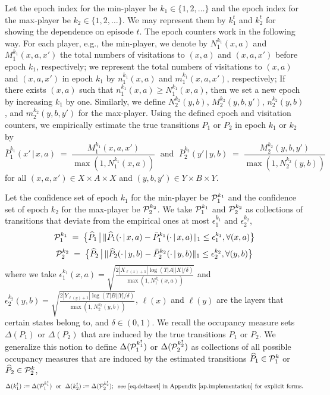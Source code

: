 \documentclass[12pt, final]{l4dc2023}
\begin{document}
Let the epoch index for the min-player be $k_1\in \{1,2,\ldots \}$ and the epoch index for the max-player be $k_2\in\{1,2,\ldots \}$. We may represent them by $k_1^t$ and $k_2^t$ for showing the dependence on episode $t$. The epoch counters work in the following way. For each player, e.g., the min-player, we denote by $N_{1}^{k_1}(x,a)$ and $M_1^{k_1}(x,a,x')$ the total numbers of visitations to $(x,a)$ and $(x,a,x')$ before epoch $k_1$, respectively; we represent the total numbers of visitations to $(x,a)$ and $(x,a,x')$ in epoch $k_1$ by $n_{1}^{k_1}(x,a)$ and $m_1^{k_1}(x,a,x')$, respectively; If there exists $(x,a)$ such that $n_{1}^{k_1}(x,a)\geq N_{1}^{k_1}(x,a)$, then we set a new epoch by increasing $k_1$ by one. Similarly, we define $N_{2}^{k_2}(y,b)$, $M_2^{k_2}(y,b,y')$,  $n_{2}^{k_2}(y,b)$, and $m_2^{k_2}(y,b,y')$ for the max-player. Using the defined epoch and visitation counters, we empirically estimate the true transitions $P_1$ or $P_2$ in epoch $k_1$ or $k_2$ by 
\[
\bar P_1^{k_1} (x'\,\vert\,x,a) \; = \;  \frac{M_1^{k_1}(x,a,x')}{\max (1,N_{1}^{k_1}(x,a))}
\; \text{ and } \;
\bar P_2^{k_2} (y'\,\vert\,y,b) \; = \; \frac{M_2^{k_2}(y,b,y')}{\max (1,N_{2}^{k_2}(y,b))}
\]
for all $(x,a,x') \in X\times A\times X$ and $(y,b,y')\in Y\times B\times Y$. 

Let the confidence set of epoch $k_1$ for the min-player be ${\mathcal{P}}_1^{k_1}$ and the confidence set of epoch $k_2$ for the max-player be ${\mathcal{P}}_2^{k_2}$. We take ${\mathcal{P}}_1^{k_1}$ and ${\mathcal{P}}_2^{k_2}$ as collections of transitions that deviate from the empirical ones at most $\epsilon_1^{k_1}$ and $\epsilon_2^{k_2}$,
\[
{\mathcal{P}}_1^{k_1} \;=\; \big\{ \widehat P_1\,\big\vert\, \Vert \widehat P_1(\cdot\,\vert\,x,a) - \bar P_1^{k_1}(\cdot\,\vert\,x,a) \Vert_1 \leq \epsilon_1^{k_1}, \forall(x,a) \big \}
\]
\vspace*{-0.4cm}
\[
{\mathcal{P}}_2^{k_2} \;=\; \big\{ \widehat P_2\,\big\vert\, \Vert \widehat P_2(\cdot\,\vert\,y,b) - \bar P_2^{k_2}(\cdot\,\vert\,y,b) \Vert_1 \leq \epsilon_2^{k_2}, \forall (y,b) \big\}
\]
where we take
$\epsilon_1^{k_1}(x,a) = \sqrt{ \frac{ 2|X_{\ell(x)+1}| \log(T|A||X|/\delta)}{\max (1, N_1^{k_1}(x,a)) } } $ and $\epsilon_2^{k_2}(y,b) = \sqrt{ \frac{ 2|Y_{\ell(y)+1}| \log(T|B||Y|/\delta)}{\max (1, N_2^{k_2}(y,b)) } } $, 
$\ell(x)$ and $\ell(y)$ are the layers that certain states belong to, and $\delta\in (0,1)$. We recall the occupancy measure sets $\Delta(P_1)$ or $\Delta(P_2)$ that are induced by the true transitions $P_1$ or $P_2$. We generalize this notion to define $\Delta({\mathcal{P}}_1^{k_1^t})$ or $\Delta({\mathcal{P}}_2^{k_2^t})$ as collections of all possible occupancy measures that are induced by the estimated transitions $\widehat P_1 \in{\mathcal{P}}_1^k$ or $\widehat P_2\in{\mathcal{P}}_2^k$,
\begin{equation}\label{eq.confidence}
\Delta(k_1^t) \mathrel{\mathop:}= \Delta({\mathcal{P}}_1^{k_1^t})
\;\text{ or }\;
\Delta(k_2^t) \mathrel{\mathop:}= \Delta({\mathcal{P}}_2^{k_2^t});
\;\; \text{see~\eqref{eq.deltaset} in Appendix \ref{ap.implementation} for explicit forms.}
\end{equation}
\end{document}
